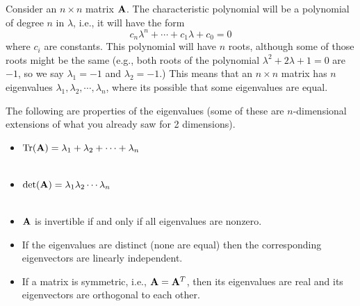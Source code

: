 Consider an $n\times n$ matrix $\mathbf{A}$. The characteristic polynomial will be a polynomial of degree $n$ in $\lambda$, i.e., it will have the form
$$c_n\lambda^n + \cdots + c_1\lambda + c_0 = 0$$
where $c_i$ are constants. This polynomial will have $n$ roots, although some of those roots might be the same (e.g., both roots of the polynomial $\lambda^2 + 2\lambda + 1=0$ are $-1$, so we say $\lambda_1=-1$ and $\lambda_2=-1$.) This means that an $n\times n$ matrix has $n$ eigenvalues $\lambda_1, \lambda_2, \cdots, \lambda_n$, where its possible that some eigenvalues are equal.

The following are properties of the eigenvalues (some of these are $n$-dimensional extensions of what you already saw for 2 dimensions).
\begin{itemize}
\item $\mbox{Tr}(\mathbf{A}) = \lambda_1+\lambda_2 + \cdots +\lambda_n$\\\
\item $\mbox{det}(\mathbf{A})= \lambda_1\lambda_2  \cdots  \lambda_n$\\\
\item $\mathbf{A}$  is invertible if and only if all eigenvalues are nonzero.
\item If the eigenvalues are distinct (none are equal) then the corresponding eigenvectors are linearly independent.
\item If a matrix is symmetric, i.e., $\mathbf{A} = \mathbf{A}^T$, then its eigenvalues are real and its eigenvectors are orthogonal to each other.
\end{itemize}


